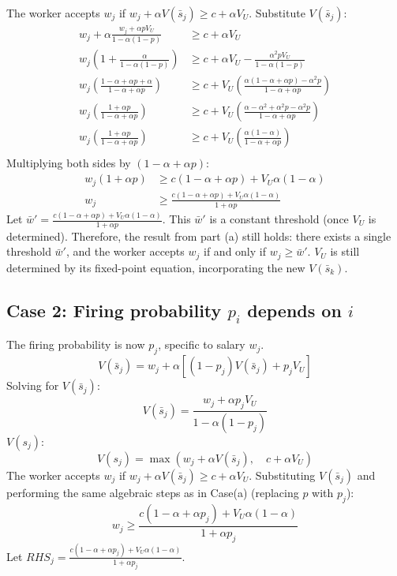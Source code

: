\documentclass[11pt, a4paper, oneside]{memoir}
\begin{document}
The worker accepts $w_j$ if $w_j + \alpha V(\bar{s}_j) \ge c + \alpha V_U$.
Substitute $V(\bar{s}_j)$:
\begin{align*}
  w_j + \alpha \frac{w_j + \alpha p V_U}{1 - \alpha(1-p)} &\ge c + \alpha V_U \\
  w_j \left(1 + \frac{\alpha}{1 - \alpha(1-p)}\right) &\ge c + \alpha V_U - \frac{\alpha^2 p V_U}{1 - \alpha(1-p)} \\
  w_j \left(\frac{1 - \alpha + \alpha p + \alpha}{1 - \alpha + \alpha p}\right) &\ge c + V_U \left(\frac{\alpha(1 - \alpha + \alpha p) - \alpha^2 p}{1 - \alpha + \alpha p}\right) \\
  w_j \left(\frac{1 + \alpha p}{1 - \alpha + \alpha p}\right) &\ge c + V_U \left(\frac{\alpha - \alpha^2 + \alpha^2 p - \alpha^2 p}{1 - \alpha + \alpha p}\right) \\
  w_j \left(\frac{1 + \alpha p}{1 - \alpha + \alpha p}\right) &\ge c + V_U \left(\frac{\alpha(1 - \alpha)}{1 - \alpha + \alpha p}\right) \\
\end{align*}
Multiplying both sides by $(1 - \alpha + \alpha p)$:
\begin{align*}
  w_j (1 + \alpha p) &\ge c(1 - \alpha + \alpha p) + V_U \alpha(1 - \alpha) \\
  w_j &\ge \frac{c(1 - \alpha + \alpha p) + V_U \alpha(1 - \alpha)}{1 + \alpha p}
\end{align*}
Let $\bar{w}' = \frac{c(1 - \alpha + \alpha p) + V_U \alpha(1 - \alpha)}{1 + \alpha p}$. 
This $\bar{w}'$ is a constant threshold (once $V_U$ is determined).
Therefore, the result from part (a) still holds: there exists a single threshold $\bar{w}'$,
and the worker accepts $w_j$ if and only if $w_j \ge \bar{w}'$. $V_U$ is still determined by its fixed-point equation,
incorporating the new $V(\bar{s}_k)$.

\subsection*{Case 2: Firing probability $p_i$ depends on $i$}
The firing probability is now $p_j$, specific to salary $w_j$.
\[ V(\bar{s}_j) = w_j + \alpha \left[ (1-p_j)V(\bar{s}_j) + p_j V_U \right] \]
Solving for $V(\bar{s}_j)$:
\[ V(\bar{s}_j) = \frac{w_j + \alpha p_j V_U}{1 - \alpha(1-p_j)} \]
$V(s_j)$:
\[ V(s_j) = \max \left( w_j + \alpha V(\bar{s}_j), \quad c + \alpha V_U \right) \]
The worker accepts $w_j$ if $w_j + \alpha V(\bar{s}_j) \ge c + \alpha V_U$.
Substituting $V(\bar{s}_j)$ and performing the same algebraic steps as in Case(a) (replacing $p$ with $p_j$):
\[ w_j \ge \frac{c(1 - \alpha + \alpha p_j) + V_U \alpha(1 - \alpha)}{1 + \alpha p_j} \]
Let $RHS_j = \frac{c(1 - \alpha + \alpha p_j) + V_U \alpha(1 - \alpha)}{1 + \alpha p_j}$.
\end{document}
